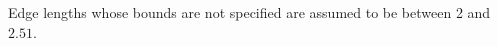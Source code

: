   Edge lengths whose bounds are not specified are assumed
to be between 2 and $2.51$.

\def\refno#1{\hbox{}\nobreak\hfill {\tt (#1)}}

\parindent=0pt








